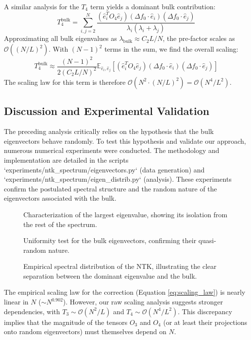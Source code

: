 \documentclass{article}
\begin{document}
A similar analysis for the $T_4$ term yields a dominant bulk contribution:
\[ T_4^{\text{bulk}} = \sum_{i,j=2}^N \frac{(\hat{e}_{i}^{T}O_{4}\hat{e}_{j})(\Delta f_{0}\cdot \hat{e}_{i})(\Delta f_{0}\cdot \hat{e}_{j})}{\lambda_i(\lambda_i+\lambda_j)} \]
Approximating all bulk eigenvalues as $\lambda_{\text{bulk}} \approx C_2 L/N$, the pre-factor scales as $\mathcal{O}((N/L)^2)$. With $(N-1)^2$ terms in the sum, we find the overall scaling:
\[ T_4^{\text{bulk}} \approx \frac{(N-1)^2}{2(C_2 L/N)^2} \mathbb{E}_{\hat{e}_i, \hat{e}_j} \left[ (\hat{e}_{i}^{T}O_{4}\hat{e}_{j})(\Delta f_{0}\cdot \hat{e}_{i})(\Delta f_{0}\cdot \hat{e}_{j}) \right] \]
The scaling law for this term is therefore $\mathcal{O}(N^2 \cdot (N/L)^2) = \mathcal{O}(N^4/L^2)$.

\subsection{Discussion and Experimental Validation}
The preceding analysis critically relies on the hypothesis that the bulk eigenvectors behave randomly. To test this hypothesis and validate our approach, numerous numerical experiments were conducted. The methodology and implementation are detailed in the scripts `experiments/ntk_spectrum/eigenvectors.py` (data generation) and `experiments/ntk_spectrum/eigen_distrib.py` (analysis). These experiments confirm the postulated spectral structure and the random nature of the eigenvectors associated with the bulk.

\begin{figure}[h!]
    \centering
    \caption{Characterization of the largest eigenvalue, showing its isolation from the rest of the spectrum.}
    \label{fig:wk7_eig1}
\end{figure}

\begin{figure}[h!]
    \centering
    \caption{Uniformity test for the bulk eigenvectors, confirming their quasi-random nature.}
    \label{fig:wk7_uniformity}
\end{figure}

\begin{figure}[h!]
    \centering
    \caption{Empirical spectral distribution of the NTK, illustrating the clear separation between the dominant eigenvalue and the bulk.}
    \label{fig:wk7_spectrum_dist}
\end{figure}

The empirical scaling law for the correction (Equation \ref{eq:scaling_law}) is nearly linear in $N$ ($\sim N^{0.902}$). However, our raw scaling analysis suggests stronger dependencies, with $T_3 \sim \mathcal{O}(N^2/L)$ and $T_4 \sim \mathcal{O}(N^4/L^2)$. This discrepancy implies that the magnitude of the tensors $O_3$ and $O_4$ (or at least their projections onto random eigenvectors) must themselves depend on $N$.
\end{document}
